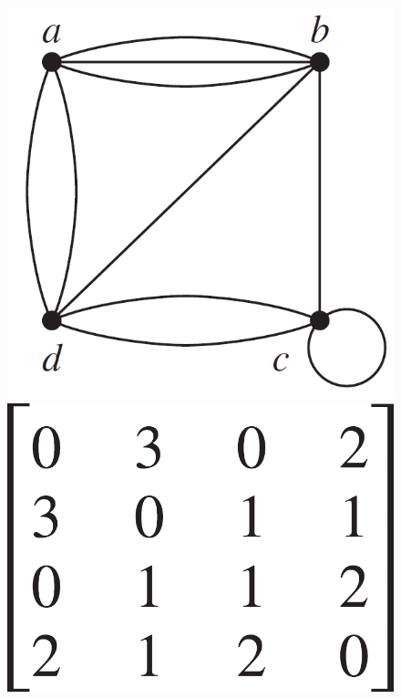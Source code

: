 \documentclass[11pt]{article}
\begin{document}
\begin{figure}[h!]
\begin{minipage}[l]{0.4\textwidth}
    \centering
    \includegraphics[width=\textwidth]{img/ch10.3-figure5_1.png}
\end{minipage}\hfill
\begin{minipage}[l]{0.4\textwidth}
    \centering
    \includegraphics[width=\textwidth]{img/ch10.3-figure5_2.png}
\end{minipage}\hfill
\end{figure}
\end{document}
